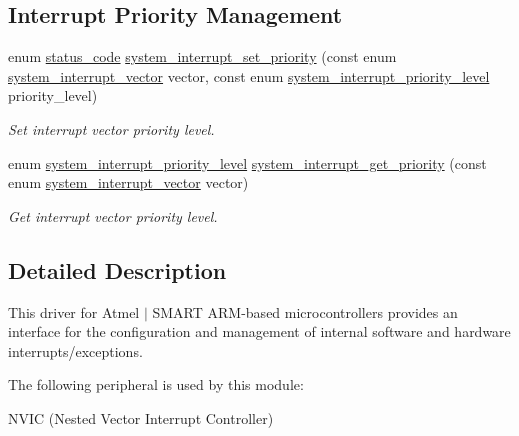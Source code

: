 \subsection*{Interrupt Priority Management}
\begin{DoxyCompactItemize}
\item 
enum \mbox{\hyperlink{group__group__sam0__utils__status__codes_ga751c892e5a46b8e7d282085a5a5bf151}{status\+\_\+code}} \mbox{\hyperlink{group__asfdoc__sam0__system__interrupt__group_ga0be1259c9dc64c3dd8f0d45e3f04ee76}{system\+\_\+interrupt\+\_\+set\+\_\+priority}} (const enum \mbox{\hyperlink{group__asfdoc__sam0__system__interrupt__group_ga43378e6222cc05290c1a0c6a9ba125cf}{system\+\_\+interrupt\+\_\+vector}} vector, const enum \mbox{\hyperlink{group__asfdoc__sam0__system__interrupt__group_ga6d21907577ff204de7f5fa4642c84589}{system\+\_\+interrupt\+\_\+priority\+\_\+level}} priority\+\_\+level)
\begin{DoxyCompactList}\small\item\em Set interrupt vector priority level. \end{DoxyCompactList}\item 
enum \mbox{\hyperlink{group__asfdoc__sam0__system__interrupt__group_ga6d21907577ff204de7f5fa4642c84589}{system\+\_\+interrupt\+\_\+priority\+\_\+level}} \mbox{\hyperlink{group__asfdoc__sam0__system__interrupt__group_ga586466a55934c76a69332b6819f4904a}{system\+\_\+interrupt\+\_\+get\+\_\+priority}} (const enum \mbox{\hyperlink{group__asfdoc__sam0__system__interrupt__group_ga43378e6222cc05290c1a0c6a9ba125cf}{system\+\_\+interrupt\+\_\+vector}} vector)
\begin{DoxyCompactList}\small\item\em Get interrupt vector priority level. \end{DoxyCompactList}\end{DoxyCompactItemize}


\subsection{Detailed Description}
This driver for Atmel\textregistered{} $\vert$ S\+M\+A\+RT A\+RM\textregistered{}-\/based microcontrollers provides an interface for the configuration and management of internal software and hardware interrupts/exceptions.

The following peripheral is used by this module\+:
\begin{DoxyItemize}
\item N\+V\+IC (Nested Vector Interrupt Controller)
\end{DoxyItemize}


